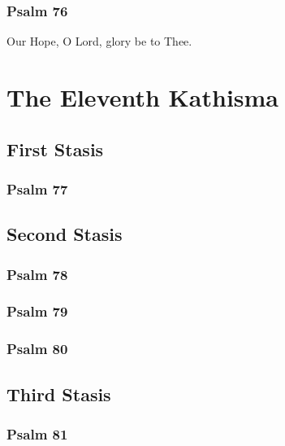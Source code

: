 \documentclass[12pt]{book}
\newcommand{\kathismabreak}{
  \medskip
  \begin{center}
  \begin{footnotesize}
  

  

  

  
  \end{footnotesize}
  \end{center}
  \smallbreak
}
\newcommand{\kathismaend}{
  \medskip
  \begin{center}
  \begin{footnotesize}
  

  

  Our Hope, O Lord, glory be to Thee.
  \end{footnotesize}
  \end{center}
  \smallbreak
}
\begin{document}
\subsubsection{Psalm 76}


\kathismaend

\section{The Eleventh Kathisma}

\subsection{First Stasis}

\subsubsection{Psalm 77}


\kathismabreak

\subsection{Second Stasis}

\subsubsection{Psalm 78}


\subsubsection{Psalm 79}


\subsubsection{Psalm 80}


\kathismabreak

\pagebreak %
\subsection{Third Stasis}

\subsubsection{Psalm 81}

\end{document}
